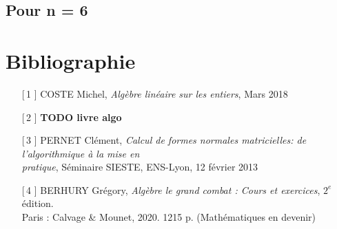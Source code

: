 \documentclass[12pt]{article}
\begin{document}
\subsection{Pour n = 6}

\newpage
\section{Bibliographie}
\begin{enumerate}

	\item[[\,1\!\!]] COSTE Michel, \textit{Algèbre linéaire sur les entiers}, Mars 2018
	\item[[\,2\!\!]] \textbf{TODO livre algo}
	\item[[\,3\!\!]] PERNET Clément, \textit{Calcul de formes normales matricielles: de
		      l'algorithmique à la mise en \\pratique}, Séminaire SIESTE, ENS-Lyon, 12 février 2013
	\item[[\,4\!\!]] BERHURY Grégory, \textit{Algèbre le grand combat : Cours et exercices},
	      $2^e$ édition.\\
	      Paris : Calvage \& Mounet, 2020. 1215 p. (Mathématiques en devenir)
\end{enumerate}
\end{document}
